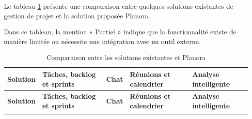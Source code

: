 Le tableau \ref{tab:comparaisonSolutions} présente une comparaison entre quelques solutions existantes de gestion de projet et la solution proposée Planora.

Dans ce tableau, la mention « Partiel » indique que la fonctionnalité existe de manière limitée ou nécessite une intégration avec un outil externe.

\begin{longtable}[c]{|p{}|p{}|p{}|p{}|p{}|}
  \caption{Comparaison entre les solutions existantes et Planora}
  \label{tab:comparaisonSolutions}                                                                                                                                                                                                                                                                                       \\

  \hline
  \textbf{Solution} & \textbf{Tâches, backlog et sprints}                                            & \textbf{Chat}                                       & \textbf{Réunions et calendrier}                              & \textbf{Analyse intelligente}                                                                \\
  \hline
  \endfirsthead

  \hline
  \textbf{Solution} & \textbf{Tâches, backlog et sprints}                                            & \textbf{Chat}                                       & \textbf{Réunions et calendrier}                              & \textbf{Analyse intelligente}                                                                \\
  \hline
  \endhead

  \hline
  \endlastfoot


\end{longtable}
